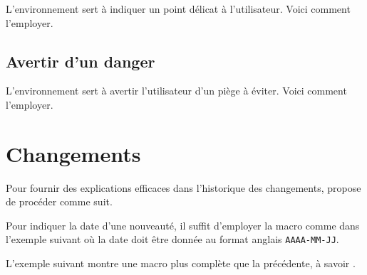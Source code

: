 \documentclass[12pt, a4paper]{article}
\begin{document}
L'environnement  sert à indiquer un point délicat à  l'utilisateur. Voici comment l'employer.




\subsection{Avertir d'un danger}

L'environnement  sert à avertir l'utilisateur d'un piège à éviter. Voici comment l'employer.



\section{Changements}

\begin{bdocexa}
    Pour fournir des explications efficaces dans l'historique des changements,  propose de procéder comme suit.

\end{bdocexa}




\begin{bdocexa}
    Pour indiquer la date d'une nouveauté, il suffit d'employer la macro  comme dans l'exemple suivant où la date doit être donnée au format anglais \texttt{AAAA-MM-JJ}.

\end{bdocexa}




\begin{bdocexa}
    L'exemple suivant montre une macro plus complète que la précédente, à savoir .

\end{bdocexa}
\end{document}
